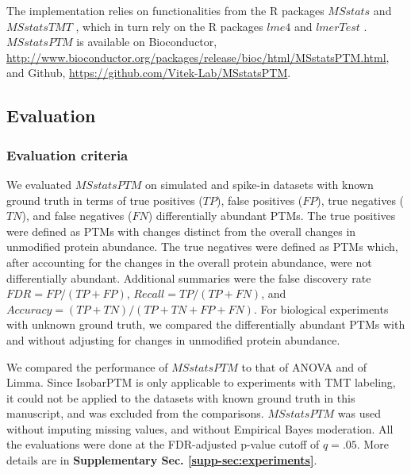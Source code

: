 \documentclass[mcp]{article}
\numberwithin{table}{section}
\begin{document}
The implementation relies on functionalities from the R packages $MSstats$ \cite{Choi:2014} and $MSstatsTMT$ \cite{Huang:2020}, which in turn rely on the R packages $lme4$ \cite{Bates2015} and $lmerTest$ \cite{Kuznetsova2017}. $MSstatsPTM$ is available on Bioconductor, \url{http://www.bioconductor.org/packages/release/bioc/html/MSstatsPTM.html}, and Github, \url{https://github.com/Vitek-Lab/MSstatsPTM}.

\subsection*{Evaluation}

\subsubsection*{Evaluation criteria}

We evaluated $MSstatsPTM$ on simulated and spike-in datasets with known ground truth in terms of true positives ($TP$), false positives ($FP$), true negatives ($TN$), and false negatives ($FN$) differentially abundant PTMs. The true positives were defined as PTMs with changes distinct from the overall changes in unmodified protein abundance. The true negatives were defined as PTMs which, after accounting for the changes in the overall protein abundance, were not differentially abundant. Additional summaries were the false discovery rate $FDR=FP/(TP+FP)$, $Recall=TP/(TP + FN)$, and $Accuracy=(TP + TN) / (TP + TN + FP + FN)$.
For biological experiments with unknown ground truth, we compared the differentially abundant PTMs with and without adjusting for changes in unmodified protein abundance. 

We compared the performance of  $MSstatsPTM$ to that of ANOVA and of Limma. Since IsobarPTM is only applicable to experiments with TMT labeling, it could not be applied to the datasets with known ground truth in this manuscript, and was excluded from the comparisons. $MSstatsPTM$ was used without imputing missing values, and without Empirical Bayes moderation. All the evaluations were done at the FDR-adjusted p-value cutoff of $q=.05$. More details are in {\bf Supplementary Sec. \ref{supp-sec:experiments}}. 

\end{document}
